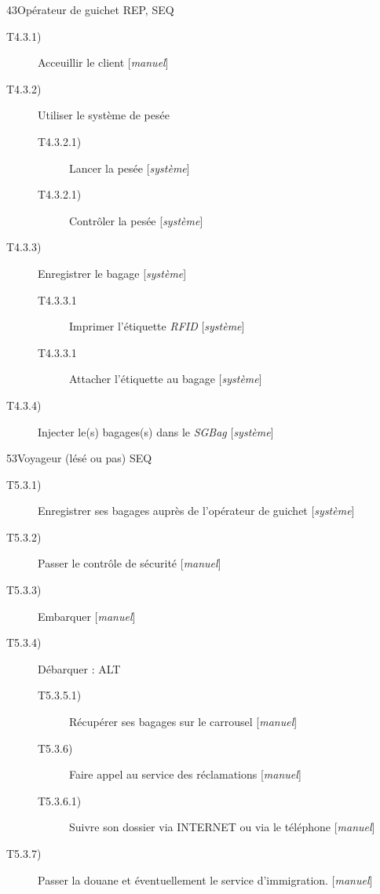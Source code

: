 \dta
{4}{3}{Opérateur de guichet}
{REP, SEQ}
{
\begin{description}
	\item [T4.3.1)] Acceuillir le client [\textsl{manuel}]
	\item [T4.3.2)] Utiliser le système de pesée
	\begin{description}
		\item [T4.3.2.1)] Lancer la pesée [\textsl{système}]
		\item [T4.3.2.1)] Contrôler la pesée [\textsl{système}]
	\end{description}
	\item [T4.3.3)] Enregistrer le bagage [\textsl{système}]
	\begin{description}
		\item [T4.3.3.1] Imprimer l'étiquette \textsl{RFID} [\textsl{système}]
		\item [T4.3.3.1] Attacher l'étiquette au bagage [\textsl{système}]
	\end{description}
	\item [T4.3.4)] Injecter le(s) bagages(s) dans le \textsl{SGBag}  [\textsl{système}]
\end{description}
}

\hspace{1cm}

\dta
{5}{3}{Voyageur (lésé ou pas)}
{SEQ}
{
\begin{description}
	\item [T5.3.1)] Enregistrer ses bagages auprès de l'opérateur de guichet [\textsl{système}]
	\item [T5.3.2)] Passer le contrôle de sécurité [\textsl{manuel}]
	\item [T5.3.3)] Embarquer [\textsl{manuel}]
	\item [T5.3.4)] Débarquer : ALT
	\begin{description}
		\item [T5.3.5.1)] Récupérer ses bagages sur le carrousel [\textsl{manuel}]
		\item [T5.3.6)] Faire appel au service des réclamations [\textsl{manuel}]
		\item [T5.3.6.1)] Suivre son dossier via INTERNET ou via le téléphone [\textsl{manuel}]
	\end{description}
	\item [T5.3.7)] Passer la douane et éventuellement le service d'immigration. [\textsl{manuel}]
\end{description}
}

\hspace{1cm}

